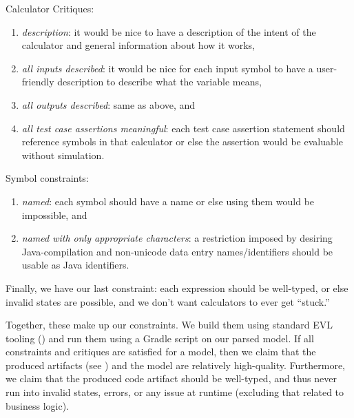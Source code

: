 \documentclass[11pt,fleqn]{article}
\begin{document}
\noindent{}Calculator Critiques:
\begin{enumerate}
  \item \textit{description}: it would be nice to have a description of the
        intent of the calculator and general information about how it works,
  \item \textit{all inputs described}: it would be nice for each input symbol to
        have a user-friendly description to describe what the variable means,
  \item \textit{all outputs described}: same as above, and
  \item \textit{all test case assertions meaningful}: each test case assertion
        statement should reference symbols in that calculator or else the
        assertion would be evaluable without simulation.
\end{enumerate}

\noindent{}Symbol constraints:
\begin{enumerate}
  \item \textit{named}: each symbol should have a name or else using them would
        be impossible, and
  \item \textit{named with only appropriate characters}: a restriction imposed
        by desiring Java-compilation and non-unicode data entry \textemdash{}
        names/identifiers should be usable as Java identifiers.
\end{enumerate}

Finally, we have our last constraint: each expression should be well-typed, or
else invalid states are possible, and we don't want calculators to ever get
``stuck.''

Together, these make up our constraints. We build them using standard EVL
tooling () and run them using a Gradle
script on our parsed model. If all constraints and critiques are satisfied for a
model, then we claim that the produced artifacts (see
) and the model are relatively
high-quality. Furthermore, we claim that the produced code artifact should be
well-typed, and thus never run into invalid states, errors, or any issue at
runtime (excluding that related to business logic).
\end{document}
